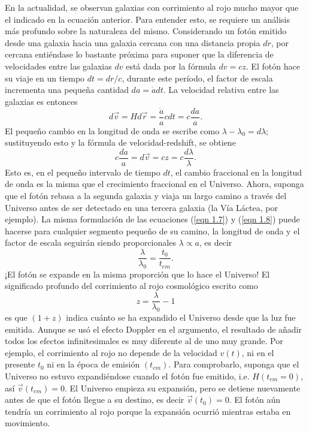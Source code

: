 \documentclass[a4paper,openright,12pt]{book}
\begin{document}
En la actualidad, se observan galaxias con corrimiento al rojo mucho mayor que el indicado en la ecuación anterior. Para entender esto, se requiere un análisis más profundo sobre la naturaleza del mismo. Considerando un fotón emitido desde una galaxia hacia una galaxia cercana con una distancia propia $dr$, por cercana entiéndase lo bastante próxima para suponer que la diferencia de velocidades entre las galaxias $dv$ está dada por la fórmula $dv = cz$. El fotón hace su viaje en un tiempo $dt = dr/c$, durante este período, el factor de escala incrementa una pequeña cantidad $da = \dot{a} dt$. La velocidad relativa entre las galaxias es entonces
\begin{equation}
d\vec{v}=Hd\vec{r}=\frac{\dot{a}}{a}cdt=c\frac{da}{a}.\label{eqn 1.7}
\end{equation}
El pequeño cambio en la longitud de onda se escribe como $ \lambda - \lambda_{0} = d\lambda$; sustituyendo esto y la fórmula de velocidad-redshift, se obtiene
\begin{equation}
c\frac{da}{a}=d\vec{v}=cz=c\frac{d\lambda}{\lambda}.\label{eqn 1.8}
\end{equation}
Esto es, en el pequeño intervalo de tiempo $dt$, el cambio fraccional en la longitud de onda es la misma que el crecimiento fraccional en el Universo. Ahora, suponga que el fotón rebasa a la segunda galaxia y viaja un largo camino a través del Universo antes de ser detectado en una tercera galaxia (la Vía Láctea, por ejemplo). La misma formulación de las ecuaciones (\ref{eqn 1.7}) y (\ref{eqn 1.8}) puede hacerse para cualquier segmento pequeño de su camino, la longitud de onda y el factor de escala seguirán siendo proporcionales $\lambda \propto a$, es decir
\begin{equation}
\frac{\lambda}{\lambda_{0}}= \frac{t_{0}}{t_{em}}.\label{eqn 1.9}
\end{equation}
¡El fotón se expande en la misma proporción que lo hace el Universo! El significado profundo del corrimiento al rojo cosmológico escrito como
\begin{equation}
z = \frac{\lambda}{\lambda_{0}} - 1\label{eqn 1.10}
\end{equation} 
es que $(1+z)$ indica cuánto se ha expandido el Universo desde que la luz fue emitida. Aunque se usó el efecto Doppler en el argumento, el resultado de añadir todos los efectos infinitesimales es muy diferente al de uno muy grande. Por ejemplo, el corrimiento al rojo no depende de la velocidad $v(t)$, ni en el presente $t_{0}$ ni en la época de emisión $(t_{em})$. Para comprobarlo, suponga que el Universo no estuvo expandiéndose cuando el fotón fue emitido, i.e. $H(t_{em}=0)$, así $\vec{v}(t_{em})=0$. El Universo empieza su expansión, pero se detiene nuevamente antes de que el fotón llegue a su destino, es decir $\vec{v}(t_{0})=0$. El fotón aún tendría un corrimiento al rojo porque la expansión ocurrió mientras estaba en movimiento.
\end{document}
